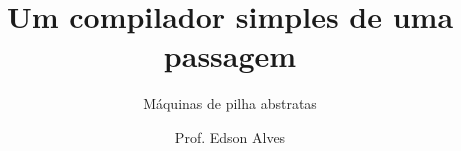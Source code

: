 \title{Um compilador simples de uma passagem}
\subtitle{Máquinas de pilha abstratas}
\date{}
\author{Prof. Edson Alves}

